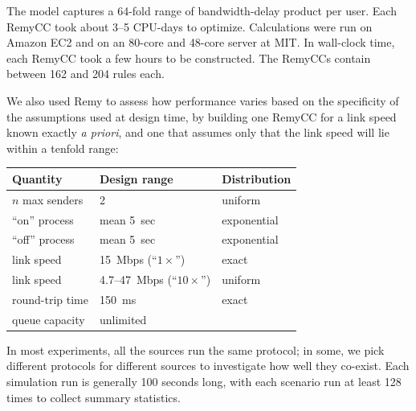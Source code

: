\vspace{\baselineskip}

The model captures a 64-fold range of bandwidth-delay product per
user. Each RemyCC took about 3--5 CPU-days to optimize. Calculations
were run on Amazon EC2 and on an 80-core and 48-core server at MIT. In
wall-clock time, each RemyCC took a few hours to be constructed.
The RemyCCs contain between 162 and 204 rules each.

We also used Remy to assess how performance varies based on the
specificity of the assumptions used at design time, by building
one RemyCC for a link speed known exactly \emph{a priori}, and
one that assumes only that the link speed will lie within a tenfold range:

\vspace{\baselineskip}

\begin{tabular}{lll}
\bf Quantity & \bf Design range & \bf Distribution \\
\hline $n$ max senders & 2 & uniform \\
``on'' process & mean 5~sec & exponential \\
``off'' process & mean 5~sec & exponential \\
link speed & 15~Mbps (``$1\times$'') & exact \\
link speed & 4.7--47~Mbps (``$10\times$'') & uniform \\
round-trip time & 150~ms & exact \\
queue capacity & unlimited & \\
\end{tabular}

\vspace{\baselineskip}

In most experiments, all the sources run the same protocol; in some,
we pick different protocols for different sources to investigate how
well they co-exist. Each simulation run is generally 100 seconds long,
with each scenario run at least 128 times to collect summary
statistics.

